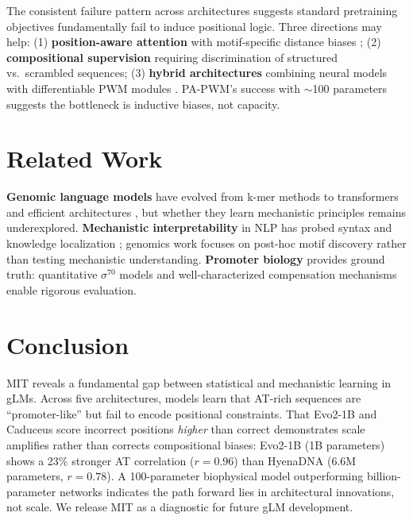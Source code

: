 \documentclass{article}
\begin{document}
The consistent failure pattern across architectures suggests standard pretraining objectives fundamentally fail to induce positional logic. Three directions may help: (1) \textbf{position-aware attention} with motif-specific distance biases \citep{jumper2021highly}; (2) \textbf{compositional supervision} requiring discrimination of structured vs.\ scrambled sequences; (3) \textbf{hybrid architectures} combining neural models with differentiable PWM modules \citep{alipanahi2015predicting,avsec2021bpnet}. PA-PWM's success with $\sim$100 parameters suggests the bottleneck is inductive biases, not capacity.

\section{Related Work}

\textbf{Genomic language models} have evolved from k-mer methods \citep{lee2011discriminative} to transformers \citep{ji2021dnabert,dalla2023nucleotide} and efficient architectures \citep{nguyen2023hyenadna,schiff2024caduceus}, but whether they learn mechanistic principles remains underexplored. \textbf{Mechanistic interpretability} in NLP has probed syntax \citep{hewitt2019structural} and knowledge localization \citep{meng2022locating}; genomics work focuses on post-hoc motif discovery \citep{novakovsky2023obtaining} rather than testing mechanistic understanding. \textbf{Promoter biology} provides ground truth: quantitative $\sigma^{70}$ models \citep{brewster2012lac,kinney2010using} and well-characterized compensation mechanisms \citep{ross1993third,barne1997region} enable rigorous evaluation.

\section{Conclusion}

MIT reveals a fundamental gap between statistical and mechanistic learning in gLMs. Across five architectures, models learn that AT-rich sequences are ``promoter-like'' but fail to encode positional constraints. That Evo2-1B and Caduceus score incorrect positions \textit{higher} than correct demonstrates scale amplifies rather than corrects compositional biases: Evo2-1B (1B parameters) shows a 23\% stronger AT correlation ($r=0.96$) than HyenaDNA (6.6M parameters, $r=0.78$). A 100-parameter biophysical model outperforming billion-parameter networks indicates the path forward lies in architectural innovations, not scale. We release MIT as a diagnostic for future gLM development.
\end{document}
